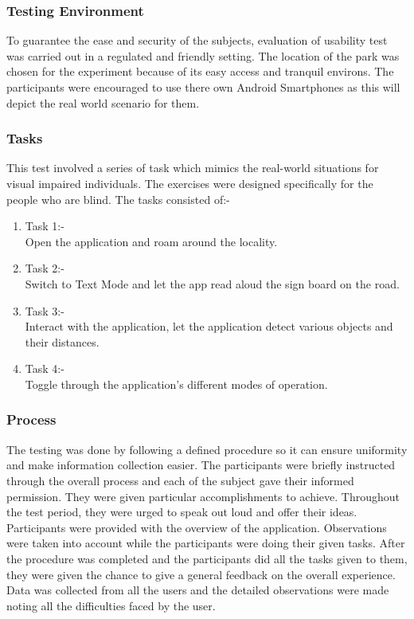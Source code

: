 \documentclass[MScCS]{uccthesis}
\begin{document}
\subsubsection{Testing Environment}
To guarantee the ease and security of the subjects, evaluation of usability test was carried out in a regulated and friendly setting. The location of the park was chosen for the experiment because of its easy access and tranquil environs. The participants were encouraged to use there own Android Smartphones as this will depict the real world scenario for them.

\subsubsection{Tasks}

This test involved a series of task which mimics the real-world situations for visual impaired individuals. The exercises were designed specifically for the people who are blind. The tasks consisted of:-

\begin{enumerate}
    \item Task 1:- 
    \\ Open the application and roam around the locality.
    \item Task 2:-
    \\Switch to Text Mode and let the app read aloud the sign board on the road.
    \item Task 3:-
    \\Interact with the application, let the application detect various objects and their distances.
    \item Task 4:-
    \\Toggle through the application's different modes of operation.
\end{enumerate}

\subsubsection{Process}
The testing  was done by following a defined procedure so it can ensure uniformity and make information collection easier. The participants were briefly instructed through the overall process and each of the subject gave their informed permission. They were given particular accomplishments to achieve. Throughout the test period, they were urged to speak out loud and offer their ideas. Participants were provided with the overview of the application. Observations were taken into account while the participants were doing their given tasks. After the procedure was completed and the participants did all the tasks given to them, they were given the chance to give a general feedback on the overall experience. Data was collected from all the users and the detailed observations were made noting all the difficulties faced by the user.
\end{document}
